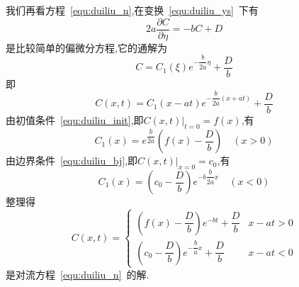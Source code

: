 我们再看方程~\eqref{equ:duiliu_n},在变换~\eqref{equ:duiliu_ys}~下有
\begin{equation}
2a\dfrac{\partial C}{\partial \eta} = -bC+D
\end{equation}
是比较简单的偏微分方程,它的通解为
\begin{equation}
C=C_1(\xi)e^{-\dfrac{b}{2a}\eta}+\dfrac{D}{b}
\end{equation}
即
\begin{equation}
C(x,t)=C_1(x-at)e^{-\dfrac{b}{2a}(x+at)}+\dfrac{D}{b}
\end{equation}
由初值条件~\eqref{equ:duiliu_init},即$\left.C(x,t)\right|_{t=0}=f(x)$,有
\begin{equation}
C_1(x)=e^{\dfrac{b}{2a}}\left(f(x)-\dfrac{D}{b}\right)\quad(x>0)
\end{equation}
由边界条件~\eqref{equ:duiliu_bj},即$\left.C(x,t)\right|_{x=0}=c_0$,有
\begin{equation}
C_1(x)=\left(c_0-\dfrac{D}{b}\right)e^{-b\dfrac{b}{2a}x}\quad(x<0)
\end{equation}
整理得
\begin{equation}
C(x,t)=
\begin{cases}
\left(f(x)-\dfrac{D}{b}\right)e^{-bt}+\dfrac{D}{b}  & x-at>0 \\
\left(c_0-\dfrac{D}{b}\right)e^{-\dfrac{b}{a}x}+\dfrac{D}{b}	&x-at<0
\end{cases}
\end{equation}
是对流方程~\eqref{equ:duiliu_n}~的解.
